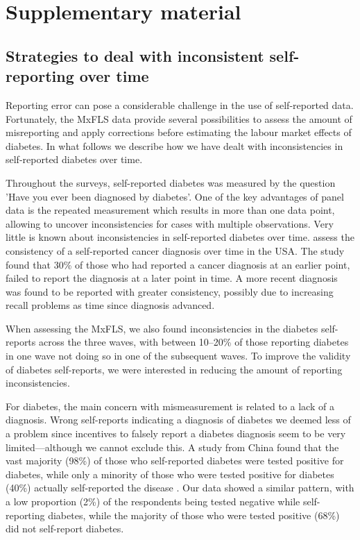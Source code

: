 \documentclass[12pt,english]{article}
\begin{document}
\section*{Supplementary material}

\subsection*{\label{sec:Appendix}Strategies to deal with inconsistent self-reporting over time}

Reporting error can pose a considerable challenge in the use of self-reported data. Fortunately, the \ac{MxFLS} data provide several possibilities to assess the amount of misreporting and apply corrections before estimating the labour market effects of diabetes. In what follows we describe how we have dealt with inconsistencies in self-reported diabetes over time.

Throughout the surveys, self-reported diabetes was measured by the question 'Have you ever been diagnosed by diabetes'. One of the key advantages of panel data is the repeated measurement which results in more than one data point, allowing to uncover inconsistencies for cases with multiple observations. Very little is known about inconsistencies in self-reported diabetes over time. \textcite{Zajacova2010} assess the consistency of a self-reported cancer diagnosis over time in the USA. The study found that 30\% of those who had reported a cancer diagnosis at an earlier point, failed to report the diagnosis at a later point in time. A more recent diagnosis was found to be reported with greater consistency, possibly due to increasing recall problems as time since diagnosis advanced.

When assessing the \ac{MxFLS}, we also found inconsistencies in the diabetes self-reports across the three waves, with between 10--20\% of those reporting diabetes in one wave not doing so in one of the subsequent waves. To improve the validity of diabetes self-reports, we were interested in reducing the amount of reporting inconsistencies.

For diabetes, the main concern with mismeasurement is related to a lack of a diagnosis. Wrong self-reports indicating a diagnosis of diabetes we deemed less of a problem since incentives to falsely report a diabetes diagnosis seem to be very limited---although we cannot exclude this.  A study from China found that the vast majority (98\%) of those who self-reported diabetes were tested positive for diabetes, while only a minority  of those who were tested positive for diabetes (40\%) actually self-reported the disease \parencite{Yuan2015}.  Our data showed a similar pattern, with a low proportion (2\%) of the respondents being tested negative while self-reporting diabetes, while the majority of those who were tested positive (68\%) did not self-report diabetes.
\end{document}
